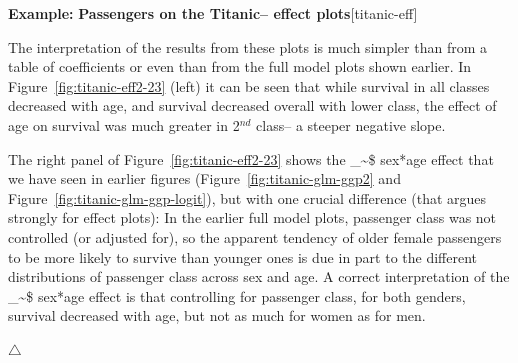 \documentclass{article}
\makeatletter
\newcommand{\figref}[1]{Figure~\ref{#1}}
\newcommand\code{\bgroup\@makeother\_\@makeother\~\@makeother\$\@codex}
\def\@codex#1{{\normalfont\ttfamily\hyphenchar\font=-1 #1}\egroup}
\newenvironment{Example}[2][unnamed-example]%
  {\medskip\noindent\textbf{\textsf{Example:}}
   \textbf{#2}\hfill [#1]\par\smallskip
  }
  {\hfill $\triangle$}
\makeatother
\begin{document}
\begin{Example}[titanic-eff]{Passengers on the Titanic-- effect plots}
The interpretation of the results from these plots is much simpler than from 
a table of coefficients or even than from the full model plots shown earlier.
In \figref{fig:titanic-eff2-23} (left) it can be seen that while survival
in all classes decreased with age, and survival decreased overall with lower
class, the effect of age on survival was much greater in 2$^{nd}$ class-- a steeper
negative slope.


The right panel of \figref{fig:titanic-eff2-23}
shows the \code{sex*age} effect that we have seen in earlier
figures (\figref{fig:titanic-glm-ggp2} and \figref{fig:titanic-glm-ggp-logit}),
but with one crucial difference (that argues strongly for effect plots):
In the earlier full model
plots, passenger class was not controlled (or adjusted for),
so the apparent tendency of older female passengers to be more likely
to survive than younger ones is due in part to the different distributions
of passenger class across sex and age.
A correct interpretation of the \code{sex*age} effect is that
controlling for passenger class,
for both genders, survival decreased with age, but not as
much for women as for men.


\end{Example}
\end{document}
